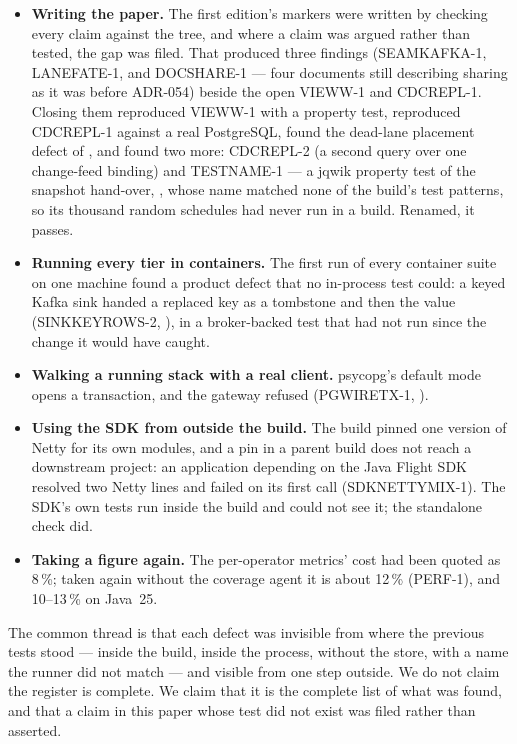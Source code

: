 \documentclass[11pt,a4paper]{article}
\renewcommand{\_}{\oldunderscore\allowbreak}
\newcommand{\code}[1]{\texttt{\pvbreakable{#1}}}
\begin{document}
\begin{itemize}[leftmargin=*,itemsep=3pt]
\item \textbf{Writing the paper.} The first edition's markers were written by checking every claim against
      the tree, and where a claim was argued rather than tested, the gap was filed. That produced three
      findings (SEAMKAFKA-1, LANEFATE-1, and DOCSHARE-1 --- four documents still describing sharing as it
      was before ADR-054) beside the open VIEWW-1 and CDCREPL-1. Closing them reproduced VIEWW-1 with a
      property test, reproduced CDCREPL-1 against a real PostgreSQL, found the dead-lane placement defect
      of , and found two more: CDCREPL-2 (a second query over one change-feed binding) and
      TESTNAME-1 --- a jqwik property test of the snapshot hand-over, \code{SnapshotHandoffProperties},
      whose name matched none of the build's test patterns, so its thousand random schedules had never run
      in a build. Renamed, it passes.
\item \textbf{Running every tier in containers.} The first run of every container suite on one machine
      found a product defect that no in-process test could: a keyed Kafka sink handed a replaced key as a
      tombstone and then the value (SINKKEYROWS-2, ), in a broker-backed test that had
      not run since the change it would have caught.
\item \textbf{Walking a running stack with a real client.} psycopg's default mode opens a transaction,
      and the gateway refused \code{BEGIN} (PGWIRETX-1, ).
\item \textbf{Using the SDK from outside the build.} The build pinned one version of Netty for its own
      modules, and a pin in a parent build does not reach a downstream project: an application depending
      on the Java Flight SDK resolved two Netty lines and failed on its first call (SDKNETTYMIX-1). The
      SDK's own tests run inside the build and could not see it; the standalone check did.
\item \textbf{Taking a figure again.} The per-operator metrics' cost had been quoted as 8\,\%; taken again
      without the coverage agent it is about 12\,\% (PERF-1), and 10--13\,\% on Java~25.
\end{itemize}

The common thread is that each defect was invisible from where the previous tests stood --- inside the
build, inside the process, without the store, with a name the runner did not match --- and visible from
one step outside. We do not claim the register is complete. We claim that it is the complete list of
what was found, and that a claim in this paper whose test did not exist was filed rather than asserted.
\end{document}
